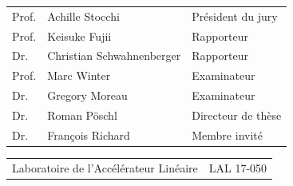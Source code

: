 \documentclass[12pt]{article}
\begin{document}
\begin{table}[H]
	\begin{tabular}{l l l }
		Prof.& Achille Stocchi & Pr\'esident du jury\\
		Prof.& Keisuke Fujii  &Rapporteur \\
		Dr.& Christian Schwahnenberger  &Rapporteur\\
		Prof.& Marc Winter &Examinateur\\
		Dr.& Gregory Moreau &Examinateur\\
		Dr.& Roman P\"oschl &Directeur de th\`{e}se\\
		Dr.& Fran\c cois Richard &Membre invit\'{e} \\
		
	\end{tabular}
\end{table}


\begin{table}[H]
	\begin{tabular}{c r}
\hline
Laboratoire de l'Acc\'el\'erateur Lin\'eaire \hspace{4cm} &LAL 17-050
	\end{tabular}
\end{table}

\clearpage



\makeatletter
\newcommand*\mysize{%
  \@setfontsize\mysize{9.5}{9.0}%
}
\makeatother
\end{document}
